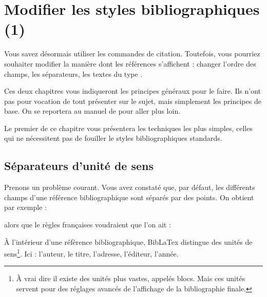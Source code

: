 \chapter{Modifier les styles bibliographiques (1)}

	\begin{prealable}
	
	Vous savez désormais utiliser les commandes de citation. Toutefois, vous pourriez souhaiter modifier la manière dont les références s'affichent :  changer l'ordre des champs, les séparateurs, les textes du type .
	
	Ces deux chapitres vous indiqueront les principes généraux pour le faire. Ils n'ont pas pour vocation de tout présenter sur le sujet, mais simplement les principes de base. On se reportera au manuel de  pour aller plus loin.
	
	Le premier de ce chapitre vous présentera les techniques les plus simples, celles qui ne nécessitent pas de fouiller le styles bibliographiques standards. 
	
	
	\end{prealable}
	
	
\section{Séparateurs d'unité de sens}
	
Prenons un problème courant. Vous avez constaté que, par défaut, les différents champs d'une référence bibliographique sont séparés par des points. On obtient par exemple :
	
	\renewcommand{\newunitpunct}[0]{\adddot\addspace} 
	
	\begin{quotation}
	\cite{Urner1952}
	\end{quotation}
	
alors que le règles françaises voudraient que l'on ait :
	
\renewcommand{\newunitpunct}[0]{\addcomma\addspace}
	
	\begin{quotation}
	\cite{Urner1952}
	\end{quotation}
	
À l'intérieur d'une référence bibliographique, BibLaTex distingue des unités de sens\footnote{À vrai dire il existe des unités plus vastes, appelés blocs. Mais ces unités servent pour des réglages avancés de l'affichage de la bibliographie finale.}. Ici : l'auteur, le titre, l'adresse, l'éditeur, l'année. 


